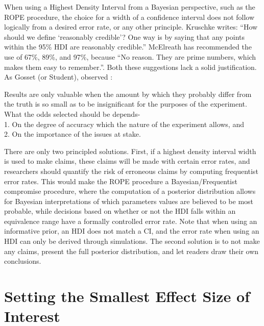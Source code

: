 \documentclass[
  oneside]{krantz}
\renewenvironment{quote}{\begin{VF}}{\end{VF}}
\begin{document}
When using a Highest Density Interval from a Bayesian perspective, such as the ROPE procedure, the choice for a width of a confidence interval does not follow logically from a desired error rate, or any other principle. Kruschke \citeyearpar{kruschke_doing_2014} writes: ``How should we define `reasonably credible'? One way is by saying that any points within the 95\% HDI are reasonably credible.'' McElreath \citeyearpar{mcelreath_statistical_2016} has recommended the use of 67\%, 89\%, and 97\%, because ``No reason. They are prime numbers, which makes them easy to remember.''. Both these suggestions lack a solid justification. As Gosset (or Student), observed \citeyearpar{gosset_application_1904}:

\begin{quote}
Results are only valuable when the amount by which they probably differ from the truth is so small as to be insignificant for the purposes of the experiment. What the odds selected should be depends-\\
1. On the degree of accuracy which the nature of the experiment allows, and\\
2. On the importance of the issues at stake.
\end{quote}

There are only two principled solutions. First, if a highest density interval width is used to make claims, these claims will be made with certain error rates, and researchers should quantify the risk of erroneous claims by computing frequentist error rates. This would make the ROPE procedure a Bayesian/Frequentist compromise procedure, where the computation of a posterior distribution allows for Bayesian interpretations of which parameters values are believed to be most probable, while decisions based on whether or not the HDI falls within an equivalence range have a formally controlled error rate. Note that when using an informative prior, an HDI does not match a CI, and the error rate when using an HDI can only be derived through simulations. The second solution is to not make any claims, present the full posterior distribution, and let readers draw their own conclusions.

\hypertarget{sesoi}{%
\section{Setting the Smallest Effect Size of Interest}\label{sesoi}}
\end{document}
